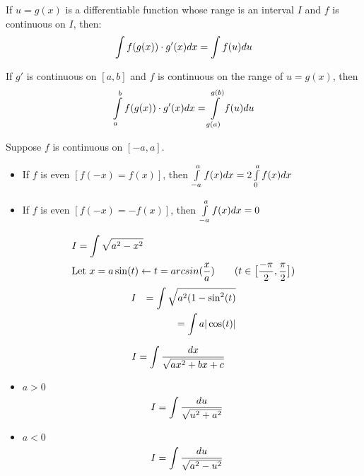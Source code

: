         \par If $u = g(x)$ is a differentiable function whose range is an interval $I$ and $f$ is
        continuous on $I$, then:
        \begin{equation}
            \int\limits f(g(x)) \cdot g'(x)dx = \int\limits f(u)du
        \end{equation}
        \par If $g'$ is continuous on $[a, b]$ and $f$ is continuous on the range of $u = g(x)$,
        then
        \begin{equation}
            \int\limits _{a}^{b} f(g(x)) \cdot g'(x)dx = \int\limits _{g(a)}^{g(b)} f(u) du
        \end{equation}
        \par Suppose $f$ is continuous on $[-a, a]$.
        \begin{itemize}
            \item If $f$ is even $[f(-x) = f(x)]$, then
                $\int\limits _{-a}^{a} f(x)dx = 2 \int\limits _{0}^{a} f(x)dx$
            \item If $f$ is even $[f(-x) = -f(x)]$, then
                $\int\limits _{-a}^{a} f(x)dx = 0$
        \end{itemize}

\begin{align*}
    &I = \int\limits \sqrt{a^{2} - x^{2}} \\
    &\mbox{Let } x = a\sin(t) \leftarrow t = arcsin(\dfrac{x}{a}) \qquad (t \in \big[\dfrac{-\pi}{2}, \dfrac{\pi}{2}\big]) \\
\end{align*}
\begin{align*}
    &I &= \int\limits \sqrt{a^{2}(1 - \sin^{2}(t)} \\
    &&= \int\limits a|\cos(t)| \\
\end{align*}

\begin{align*}
    &I = \int\limits \dfrac{dx}{\sqrt{ax^{2} + bx + c}}
\end{align*}
\begin{itemize}
    \item $a > 0$
        \begin{align*}
            &I = \int\limits \dfrac{du}{\sqrt{u^2 + a^{2}}}
        \end{align*}
    \item $a < 0$
        \begin{align*}
            &I = \int\limits \dfrac{du}{\sqrt{a^2 - u^{2}}}
        \end{align*}

\end{itemize}
